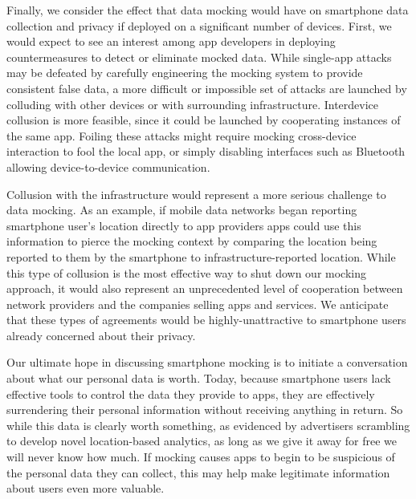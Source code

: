 Finally, we consider the effect that data mocking would have on smartphone
data collection and privacy if deployed on a significant number of devices.
First, we would expect to see an interest among app developers in deploying
countermeasures to detect or eliminate mocked data. While single-app attacks
may be defeated by carefully engineering the mocking system to provide
consistent false data, a more difficult or impossible set of attacks are
launched by colluding with other devices or with surrounding infrastructure.
Interdevice collusion is more feasible, since it could be launched by
cooperating instances of the same app. Foiling these attacks might require
mocking cross-device interaction to fool the local app, or simply disabling
interfaces such as Bluetooth allowing device-to-device communication.

Collusion with the infrastructure would represent a more serious challenge to
data mocking. As an example, if mobile data networks began reporting
smartphone user's location directly to app providers apps could use this
information to pierce the mocking context by comparing the location being
reported to them by the smartphone to infrastructure-reported location. While
this type of collusion is the most effective way to shut down our mocking
approach, it would also represent an unprecedented level of cooperation
between network providers and the companies selling apps and services. We
anticipate that these types of agreements would be highly-unattractive to
smartphone users already concerned about their privacy.

\newpage

Our ultimate hope in discussing smartphone mocking is to
initiate a conversation about what our personal data is worth. Today, because
smartphone users lack effective tools to control the data they provide to
apps, they are effectively surrendering their personal information without
receiving anything in return. So while this data is clearly worth something,
as evidenced by advertisers scrambling to develop novel location-based
analytics, as long as we give it away for free we will never know how much.
If mocking causes apps to begin to be suspicious of the personal data they
can collect, this may help make legitimate information about users even more 
valuable.
